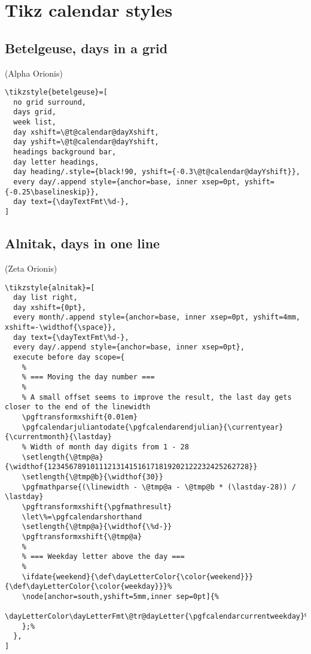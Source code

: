 \documentclass[11pt,oneside]{memoir-article}
\begin{document}
\section{Tikz calendar styles}
\label{sec-10-7}
\subsection{Betelgeuse, days in a grid}
\label{sec-10-7-1}

(Alpha Orionis)

\begin{verbatim}
\tikzstyle{betelgeuse}=[
  no grid surround,
  days grid,
  week list,
  day xshift=\@t@calendar@dayXshift,
  day yshift=\@t@calendar@dayYshift,
  headings background bar,
  day letter headings,
  day heading/.style={black!90, yshift={-0.3\@t@calendar@dayYshift}},
  every day/.append style={anchor=base, inner xsep=0pt, yshift={-0.25\baselineskip}},
  day text={\dayTextFmt\%d-},
]
\end{verbatim}

\subsection{Alnitak, days in one line}
\label{sec-10-7-2}

(Zeta Orionis)

\begin{verbatim}
\tikzstyle{alnitak}=[
  day list right,
  day xshift={0pt},
  every month/.append style={anchor=base, inner xsep=0pt, yshift=4mm, xshift=-\widthof{\space}},
  day text={\dayTextFmt\%d-},
  every day/.append style={anchor=base, inner xsep=0pt},
  execute before day scope={
    %
    % === Moving the day number ===
    %
    % A small offset seems to improve the result, the last day gets closer to the end of the linewidth
    \pgftransformxshift{0.01em}
    \pgfcalendarjuliantodate{\pgfcalendarendjulian}{\currentyear}{\currentmonth}{\lastday}
    % Width of month day digits from 1 - 28
    \setlength{\@tmp@a}{\widthof{12345678910111213141516171819202122232425262728}}
    \setlength{\@tmp@b}{\widthof{30}}
    \pgfmathparse{(\linewidth - \@tmp@a - \@tmp@b * (\lastday-28)) / \lastday}
    \pgftransformxshift{\pgfmathresult}
    \let\%=\pgfcalendarshorthand
    \setlength{\@tmp@a}{\widthof{\%d-}}
    \pgftransformxshift{\@tmp@a}
    %
    % === Weekday letter above the day ===
    %
    \ifdate{weekend}{\def\dayLetterColor{\color{weekend}}}{\def\dayLetterColor{\color{weekday}}}%
    \node[anchor=south,yshift=5mm,inner sep=0pt]{%
      \dayLetterColor\dayLetterFmt\@tr@dayLetter{\pgfcalendarcurrentweekday}%
    };%
  },
]
\end{verbatim}
\end{document}
